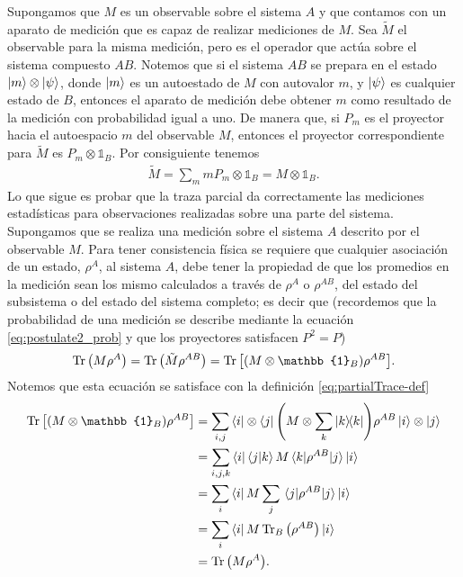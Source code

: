 Supongamos que $M$ es un observable sobre el sistema $A$ y que
contamos con un aparato de medición que es capaz de realizar mediciones
de $M$. Sea $\tilde{M}$ el observable para la misma medición, pero 
es el operador que actúa sobre el sistema compuesto $AB$. 
Notemos que si el sistema
$AB$ se prepara en el estado $\ket{m}\otimes \ket{\psi}$, donde $\ket{m}$
es un autoestado de $M$ con autovalor $m$, y $\ket{\psi}$ es 
cualquier estado de $B$, entonces el aparato de medición 
debe obtener $m$ como resultado de la medición con probabilidad igual a uno.
De manera que, si $P_m$ es el proyector hacia el autoespacio $m$ del
observable $M$, entonces el proyector correspondiente para $\tilde{M}$
es $P_m\otimes \mathbb{1}_B$. Por consiguiente tenemos
\begin{align}
	\tilde{M} = \sum_m mP_m\otimes \mathbb{1}_B=M\otimes \mathbb{1}_B.
\end{align}
Lo que sigue es probar que la traza parcial da correctamente las 
mediciones estadísticas para observaciones realizadas sobre una 
parte del sistema. Supongamos que se realiza una medición sobre
el sistema $A$ descrito por el observable $M$. Para tener 
consistencia física se requiere que cualquier asociación de un estado,
$\rho^A$, al sistema $A$, debe tener la propiedad de que los promedios
en la medición sean los mismo calculados a través de $\rho^A$ o $\rho^{AB}$,
del estado del subsistema o del estado del sistema completo;
es decir que (recordemos que la probabilidad de una medición 
se describe mediante la ecuación \eqref{eq:postulate2_prob}
y que los proyectores satisfacen $P^2=P$)
\begin{align}
	\Tr \qty(M\rho^A) = \Tr \qty(\tilde{M}\rho^{AB}) = 
	\Tr \qty[\qty(M\otimes\mathbb{1}_B)\rho^{AB}].
	\label{eq:partial-trace}
\end{align}
Notemos que esta ecuación se satisface con la definición
\eqref{eq:partialTrace-def}
\begin{align}
	\Tr \qty[\qty(M\otimes\mathbb{1}_B)\rho^{AB}] 
	&= \sum_{i,j} \bra{i}\ten\bra{j}	\qty(M\ten \sum_k\dyad{k}{k})
	\rho^{AB}
	\ket{i}\ten\ket{j} \nonumber \\
	&= \sum_{i,j,k} \bra{i}\braket{j}{k}M\matrixel{k}{\rho^{AB}}{j}\ket{i}
  \nonumber \\
	&= \sum_{i} \bra{i}M\sum_j \matrixel{j}{\rho^{AB}}{j}\ket{i} \nonumber \\
	&= \sum_i \bra{i}M\Tr_B\qty(\rho^{AB})\ket{i} \nonumber \\
	&= \Tr\qty(M \rho^A).
\end{align}
